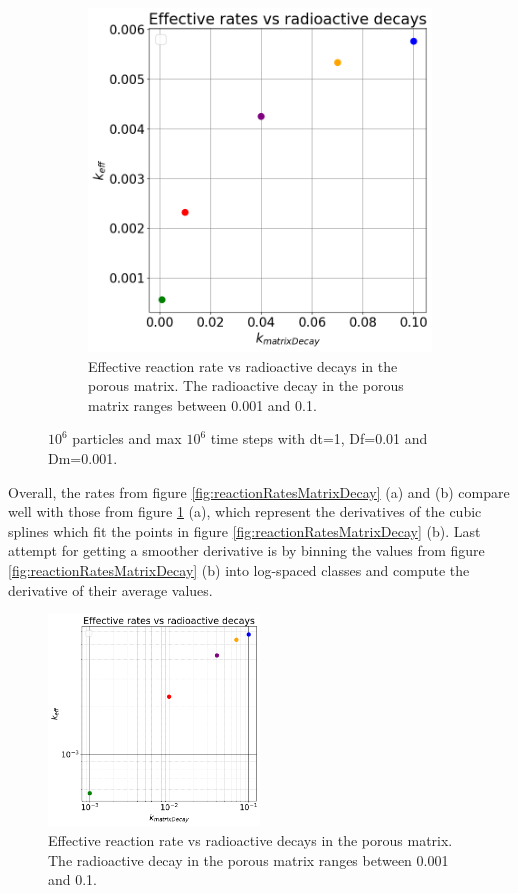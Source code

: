\documentclass{article}
\begin{document}
\begin{figure}[htbp]
\begin{subfigure}[b]{0.48\textwidth}
        \includegraphics[width=\textwidth]{images/effVsDecayRates.png}
        \caption{Effective reaction rate vs radioactive decays in the porous matrix. The radioactive decay in the porous matrix ranges between 0.001 and 0.1.}
    \end{subfigure}
    \caption{$10^6$ particles and max $10^6$ time steps with dt=1, Df=0.01 and Dm=0.001.}
    \label{fig:effVsRadioactivedecays}
\end{figure}
Overall, the rates from figure \ref{fig:reactionRatesMatrixDecay} (a) and (b) compare well with those from figure \ref{fig:effVsRadioactivedecays} (a), which represent the derivatives of the cubic splines which fit the points in figure \ref{fig:reactionRatesMatrixDecay} (b). Last attempt for getting a smoother derivative is by binning the values from figure \ref{fig:reactionRatesMatrixDecay} (b) into log-spaced classes and compute the derivative of their average values.
\begin{figure}[h]
    \centering
    \includegraphics[width=0.5\textwidth]{images/effVsDecayRatesLogLog.png}
    \caption{Effective reaction rate vs radioactive decays in the porous matrix. The radioactive decay in the porous matrix ranges between 0.001 and 0.1.}
    \label{fig:KeffVsDmLog}
\end{figure}
\end{document}
